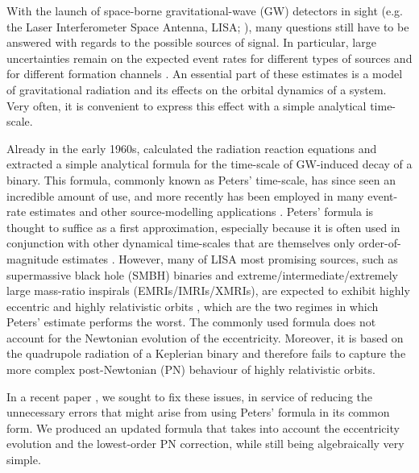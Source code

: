 \documentclass[usenatbib]{mnras}
\begin{document}
With the launch of space-borne gravitational-wave (GW) detectors in sight (e.g. the Laser Interferometer Space Antenna, LISA; \citealt{pau_2013,Barack_et_al_2019}), many questions still have to be answered with regards to the possible sources of signal. In particular, large uncertainties remain on the expected event rates for different types of sources and for different formation channels \citep[e.g.][]{klein,Babak}. An essential part of these estimates is a model of gravitational radiation and its effects on the orbital dynamics of a system. Very often, it is convenient to express this effect with a simple analytical time-scale.

Already in the early 1960s, \citet{Peters_Mathews_1963} calculated the radiation reaction equations and extracted a simple analytical formula for the time-scale of GW-induced decay of a binary. This formula, commonly known as Peters' time-scale, has since seen an incredible amount of use, and more recently has been employed in many event-rate estimates and other source-modelling applications \citep[see, e.g.][amongst many others]{2015MNRAS.447L..80F,2016ApJ...828...77V,2019MNRAS.485.2125B}. Peters' formula is thought to suffice as a first approximation, especially because it is often used in conjunction with other dynamical time-scales that are themselves only order-of-magnitude estimates \citep[see, e.g.][]{2015MNRAS.454L..66S}. However, many of LISA most promising sources, such as supermassive black hole (SMBH) binaries and extreme/intermediate/extremely large mass-ratio inspirals (EMRIs/IMRIs/XMRIs), are expected to exhibit highly eccentric and highly relativistic orbits \citep[see, e.g.][]{Amaro-Seoane2007,Antonini2016,Bonetti2016,Bonetti_et_al_2018,Khan_et_al_2018,pau1,Bonetti2019,Giacobbo2019,Giacobbo2019b,Amaro_Seoane_2019}, which are the two regimes in which Peters' estimate performs the worst. The commonly used formula does not account for the Newtonian evolution of the eccentricity. Moreover, it is based on the quadrupole radiation of a Keplerian binary and therefore fails to capture the more complex post-Newtonian (PN) behaviour of highly relativistic orbits.

In a recent paper \citep[hereafter Paper~I]{paper1}, we sought to fix these issues, in service of reducing the unnecessary errors that might arise from using Peters' formula in its common form. We produced an updated formula that takes into account the eccentricity evolution and the lowest-order PN correction, while still being algebraically very simple.
\end{document}
